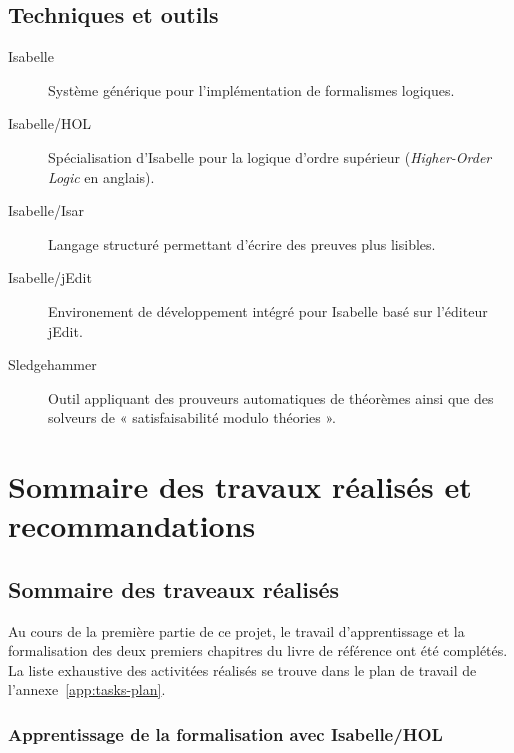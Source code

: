 \documentclass[a4paper, oneside, 12pt, titlepage]{article}
\begin{document}
\subsection{Techniques et outils}

\begin{description}
  \item[Isabelle] Système générique pour l'implémentation de formalismes logiques.
  \item[Isabelle/HOL] Spécialisation d'Isabelle pour la logique d'ordre supérieur
    (\emph{Higher-Order Logic} en anglais).
  \item[Isabelle/Isar] Langage structuré permettant d'écrire des preuves plus lisibles.
  \item[Isabelle/jEdit] Environement de développement intégré pour Isabelle basé sur l'éditeur
    jEdit.
  \item[Sledgehammer] Outil appliquant des prouveurs automatiques de théorèmes ainsi que des
    solveurs de « satisfaisabilité modulo théories ».
\end{description}

\section{Sommaire des travaux réalisés et recommandations}

\subsection{Sommaire des traveaux réalisés}



Au cours de la première partie de ce projet, le travail d'apprentissage et la formalisation des deux
premiers chapitres du livre de référence ont été complétés. La liste exhaustive des activitées
réalisés se trouve dans le plan de travail de l'annexe~\ref{app:tasks-plan}.

\subsubsection{Apprentissage de la formalisation avec Isabelle/HOL}
\end{document}

